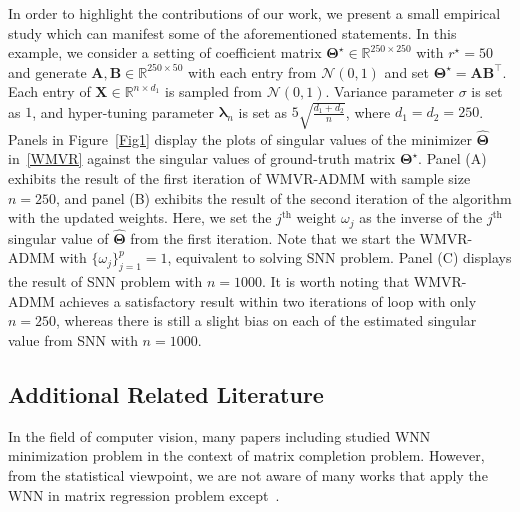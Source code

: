 \documentclass[alpha-refs]{wiley-article}
\begin{document}
In order to highlight the contributions of our work, we present a small empirical study which can manifest some of the aforementioned statements.
In this example, we consider a setting of coefficient matrix $\boldsymbol{\Theta}^{\star}\in\mathbb{R}^{250 \times 250}$ with $r^{\star}=50$ and generate $\boldsymbol{A}, \boldsymbol{B} \in \mathbb{R}^{250 \times 50}$ with each entry from $\mathcal{N}(0,1)$ and set $\boldsymbol{\Theta}^{\star}=\boldsymbol{AB^{\top}}$.
Each entry of $\boldsymbol{X}\in\mathbb{R}^{n \times d_{1}}$ is sampled from $\mathcal{N}(0,1)$.
Variance parameter $\sigma$ is set as $1$, and hyper-tuning parameter $\boldsymbol{\lambda}_{n}$ is set as $5\sqrt{\frac{d_{1}+d_{2}}{n}}$, where $d_{1}=d_{2}=250$.
Panels in Figure~\ref{Fig1} display the plots of singular values of the minimizer $\widehat{\boldsymbol{\Theta}}$ in~\eqref{WMVR} against the singular values of ground-truth matrix $\boldsymbol{\Theta^{\star}}$.
Panel (A) exhibits the result of the first iteration of WMVR-ADMM with sample size $n=250$, and panel (B) exhibits the result of the second iteration of the algorithm with the updated weights.
Here, we set the $j^{\text{th}}$ weight $\omega_{j}$ as the inverse of the $j^{\text{th}}$ singular value of $\widehat{\boldsymbol{\Theta}}$ from the first iteration. 
Note that we start the WMVR-ADMM with $\{\omega_{j}\}_{j=1}^{p}=1$, equivalent to solving SNN problem.
Panel (C) displays the result of SNN problem with $n=1000$.
It is worth noting that WMVR-ADMM achieves a satisfactory result within two iterations of loop with only $n=250$, whereas there is still a slight bias on each of the estimated singular value from SNN with $n=1000$.

\subsection{Additional Related Literature}
In the field of computer vision, many papers including \citet{gu2014weighted,gu2017weighted,xu2017multi,yair2018multi,liu2018speckle,kim2020cauchy} studied WNN minimization problem in the context of matrix completion problem.
However, from the statistical viewpoint, we are not aware of many works that apply the WNN in matrix regression problem except~\citet{chen2013reduced}.
\end{document}
